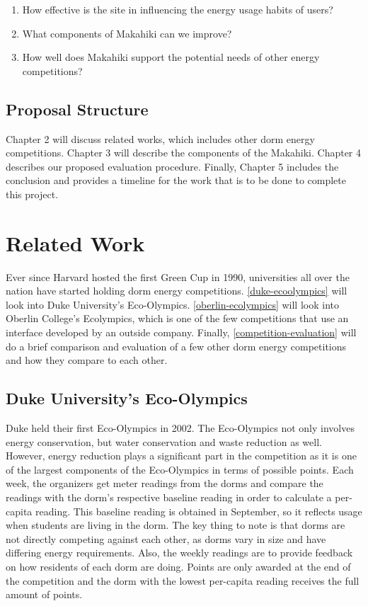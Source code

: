 \begin{enumerate}
	\item How effective is the site in influencing the energy usage habits of users?
	\item What components of Makahiki can we improve?
	\item How well does Makahiki support the potential needs of other energy competitions?
\end{enumerate}

\section{Proposal Structure}

Chapter 2 will discuss related works, which includes other dorm energy competitions.  Chapter 3 will describe the components of the Makahiki.  Chapter 4 describes our proposed evaluation procedure.  Finally, Chapter 5 includes the conclusion and provides a timeline for the work that is to be done to complete this project.

\chapter{Related Work}
\label{relatedwork}

Ever since Harvard hosted the first Green Cup in 1990\cite{harvard-greencup}, universities all over the nation have started holding dorm energy competitions. \autoref{duke-ecoolympics} will look into Duke University's Eco-Olympics.  \autoref{oberlin-ecolympics} will look into Oberlin College's Ecolympics, which is one of the few competitions that use an interface developed by an outside company. Finally, \autoref{competition-evaluation} will do a brief comparison and evaluation of a few other dorm energy competitions and how they compare to each other.

\section{Duke University's Eco-Olympics}
\label{duke-ecoolympics}

Duke held their first Eco-Olympics\cite{duke-eco-olympics} in 2002.  The Eco-Olympics not only involves energy conservation, but water conservation and waste reduction as well.  However, energy reduction plays a significant part in the competition as it is one of the largest components of the Eco-Olympics in terms of possible points.  Each week, the organizers get meter readings from the dorms and compare the readings with the dorm's respective baseline reading in order to calculate a per-capita reading.  This baseline reading is obtained in September, so it reflects usage when students are living in the dorm.   The key thing to note is that dorms are not directly competing against each other, as dorms vary in size and have differing energy requirements.  Also, the weekly readings are to provide feedback on how residents of each dorm are doing.  Points are only awarded at the end of the competition and the dorm with the lowest per-capita reading receives the full amount of points.

